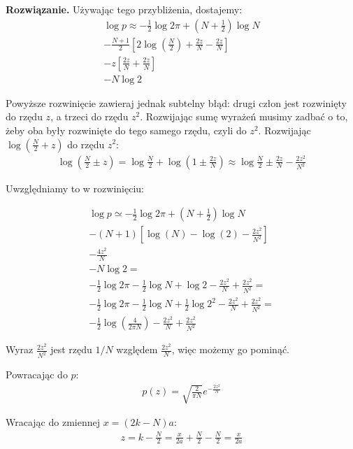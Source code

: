 \documentclass[11pt,a4paper]{article}
\newenvironment{solution}{\vspace{1cm} \par\textbf{Rozwiązanie.} \vspace{1cm}}{}
\begin{document}
\begin{solution}
Używając tego przybliżenia, dostajemy:
\begin{align*}
\log p \approx -\frac{1}{2} \log 2\pi + \left(N + \frac{1}{2}\right) \log N \\
         - \frac{N+1}{2} \left[ 2\log(\frac{N}{2}) + \frac{2z}{N} - \frac{2z}{N} \right] \\
         - z \left[\frac{2z}{N} + \frac{2z}{N} \right] \\
         - N \log 2
\end{align*}

Powyższe rozwinięcie zawieraj jednak subtelny błąd: 
drugi człon jest rozwinięty do rzędu $z$, a trzeci do rzędu $z^2$.
Rozwijając sumę wyrażeń musimy zadbać o to, żeby oba 
były rozwinięte do tego samego rzędu, czyli do $z^2$.
Rozwijając $\log(\frac{N}{2} + z)$ do rzędu $z^2$:
\begin{align*}
    \log(\frac{N}{2} \pm z) = \log \frac{N}{2} + \log(1 \pm \frac{2z}{N}) \approx 
    \log \frac{N}{2} \pm \frac{2z}{N} - \frac{2z^2}{N^2}
\end{align*}

Uwzględniamy to w rozwinięciu:

\begin{align*}
          \log p \simeq -\frac{1}{2} \log 2\pi + \left(N + \frac{1}{2}\right) \log N \\
          - (N+1) \left[ \log(N) - \log(2) - \frac{2z^2}{N^2} \right] \\
          - \frac{4z^2}{N} \\
          - N \log 2 = \\
          -\frac{1}{2} \log 2\pi - \frac{1}{2} \log N + \log 2 - \frac{2z^2}{N} + \frac{2z^{2}}{N^2}= \\
          -\frac{1}{2} \log 2\pi - \frac{1}{2} \log N + \frac{1}{2} \log 2^{2} - \frac{2z^2}{N} + \frac{2z^{2}}{N^2} = \\
          -\frac{1}{2} \log \left( \frac{4}{2\pi N} \right) - \frac{2z^2}{N} + \frac{2z^{2}}{N^2}
\end{align*}

Wyraz $\frac{2z^2}{N^2}$ jest rzędu $1/N$ względem $\frac{2z^2}{N}$, więc możemy 
go pominąć.

Powracając do $p$:
\begin{align*}
    p(z) = \sqrt{\frac{2}{\pi N}} e^{-\frac{2z^2}{N}}
\end{align*}

Wracając do zmiennej $x = (2k - N)a$:
\begin{align*}
    z = k - \frac{N}{2} = \frac{x}{2a} + \frac{N}{2}  - \frac{N}{2} = \frac{x}{2a}
\end{align*}


\end{solution}
\end{document}
